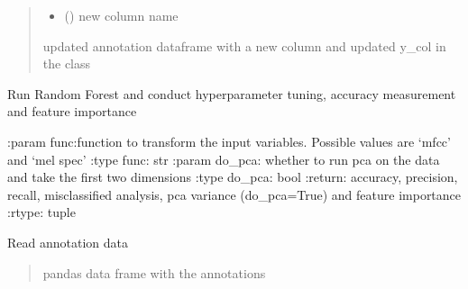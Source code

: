 \documentclass[letterpaper,10pt,english]{sphinxmanual}
\begin{document}
\begin{fulllineitems}
\begin{fulllineitems}
\begin{quote}
\begin{description}
\begin{itemize}
\item {} 
\sphinxAtStartPar
{} () \textendash{} new column name

\end{itemize}

\sphinxAtStartPar
updated annotation dataframe with a new column and updated y\_col in the class

\end{description}\end{quote}

\end{fulllineitems}


\begin{fulllineitems}
\label{\detokenize{BeeClassification:BeeClassification.BeeClassification.random_forest_results}}
\pysigstartsignatures
{}
\pysigstopsignatures
\sphinxAtStartPar
Run Random Forest and conduct hyperparameter tuning, accuracy measurement and feature importance

\sphinxAtStartPar
:param func:function to transform the input variables. Possible values are ‘mfcc’ and ‘mel spec’
:type func: str
:param do\_pca: whether to run pca on the data and take the first two dimensions
:type do\_pca: bool
:return: accuracy, precision, recall, misclassified analysis, pca variance (do\_pca=True) and feature importance
:rtype: tuple

\end{fulllineitems}


\begin{fulllineitems}
\label{\detokenize{BeeClassification:BeeClassification.BeeClassification.read_annotation_csv}}
\pysigstartsignatures
{}
\pysigstopsignatures
\sphinxAtStartPar
Read annotation data
\begin{quote}\begin{description}
\sphinxAtStartPar
pandas data frame with the annotations


\end{description}
\end{quote}
\end{fulllineitems}
\end{fulllineitems}
\end{document}
